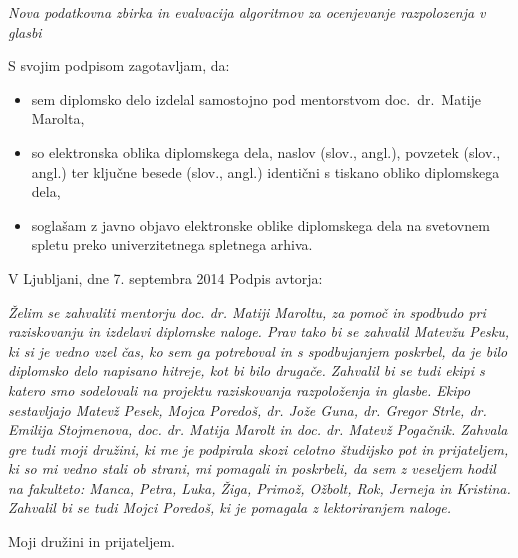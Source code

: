 \documentclass[a4paper, 12pt]{book}
\newcommand{\ttitle}{Nova podatkovna zbirka in evalvacija algoritmov za ocenjevanje razpolozenja v glasbi}
\newcommand{\clearemptydoublepage}{\newpage{\pagestyle{empty}\cleardoublepage}}
\begin{document}
{\vspace{0.5cm}
\emph{\ttitle}

\vspace{1.5cm}
\noindent S svojim podpisom zagotavljam, da:
\begin{itemize}
	\item sem diplomsko delo izdelal samostojno pod mentorstvom
		doc.\ dr.\ Matije Marolta,

	\item	so elektronska oblika diplomskega dela, naslov (slov., angl.), povzetek (slov., angl.) ter ključne besede (slov., angl.) identični s tiskano obliko diplomskega dela,
	\item soglašam z javno objavo elektronske oblike diplomskega dela na svetovnem spletu preko univerzitetnega spletnega arhiva.	
\end{itemize}

\vspace{1cm}
\noindent V Ljubljani, dne 7. septembra 2014 \hfill Podpis avtorja:

\clearemptydoublepage

\thispagestyle{empty}\mbox{}\vfill\null\it%
Želim se zahvaliti mentorju doc. dr. Matiji Maroltu, za pomoč in spodbudo pri raziskovanju in izdelavi diplomske naloge. Prav tako bi se zahvalil Matevžu Pesku, ki si je vedno vzel čas, ko sem ga potreboval in s spodbujanjem poskrbel, da je bilo diplomsko delo napisano hitreje, kot bi bilo drugače. Zahvalil bi se tudi ekipi s katero smo sodelovali na projektu raziskovanja razpoloženja in glasbe. Ekipo sestavljajo Matevž Pesek, Mojca Poredoš, dr. Jože Guna, dr. Gregor Strle, dr. Emilija Stojmenova, doc. dr. Matija Marolt in doc. dr. Matevž Pogačnik. Zahvala gre tudi moji družini, ki me je podpirala skozi celotno študijsko pot in prijateljem, ki so mi vedno stali ob strani, mi pomagali in poskrbeli, da sem z veseljem hodil na fakulteto: Manca, Petra, Luka, Žiga, Primož, Ožbolt, Rok, Jerneja in Kristina. Zahvalil bi se tudi Mojci Poredoš, ki je pomagala z lektoriranjem naloge. 
\rm\normalfont

\clearemptydoublepage

\thispagestyle{empty}\mbox{}{\textheight}\mbox{}\hfill\begin{minipage}{0.55\textwidth}%
Moji družini in prijateljem.
\normalfont\end{minipage}

}
\end{document}
